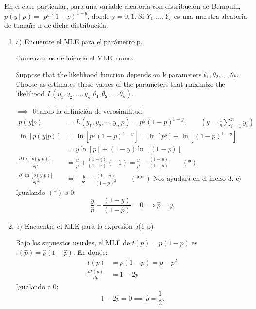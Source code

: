 En el caso particular, para una variable aleatoria con distribución de Bernoulli, $p(y \mid p)=$ $p^{y}(1-p)^{1-y}$, donde $\mathrm{y}=0,1 .$ Si $Y_{1}, \ldots, Y_{n}$ es una muestra aleatoria de tamaño $\mathrm{n}$ de dicha distribución.

\begin{enumerate}
	\item a) Encuentre el MLE para el parámetro p.
	\begin{solution}
		Comenzamos definiendo el MLE, como: 
		\begin{tcolorbox}[colback=gray!15,colframe=black!1!black,title=Method of Maximum Likehood]
			Suppose that the likelihood function depends on k parameters $\theta_1,\theta_2,...,\theta_k$. Choose as estimates those values of the parameters that maximize the likelihood $L(y_1, y_2,..., y_n |\theta_1,\theta_2,...,\theta_k)$.
			\end{tcolorbox}
$\implies$ Usando la definición de verosimilitud: 
\begin{align*}
	p(y|p) &= L(y_1,y_2,\cdots, y_n | p) = p^y(1-p)^{1-y}, \qquad \left(y=\frac{1}{n}\sum_{i=1}^{n}y_i\right)\\
	\ln\left[	p(y|p)\right] &= \ln\left[ p^y(1-p)^{1-y}\right] = \ln\left[p^y\right]+\ln\left[(1-p)^{1-y}\right]\\
	&= y\ln\left[p\right]+(1-y)\ln\left[(1-p)\right]\\
	\frac{\partial\ln\left[	p(y|p)\right]}{\partial p} &= \frac{y}{p}+\frac{(1-y)}{(1-p)}(-1) = \frac{y}{p}-\frac{(1-y)}{(1-p)} \qquad (*)\\
	 \frac{\partial^2\ln\left[	p(y|p)\right]}{\partial p^2} &= -\frac{y}{p^2}-\frac{(1-y)}{(1-p)^2}\qquad \text{$(**)$ Nos ayudará en el inciso 3. c)}
\end{align*}
Igualando $(*)$ a 0: 
$$ \frac{y}{\hat{p}}-\frac{(1-y)}{(1-\hat{p})} =0\implies \hat{p}= y.$$
	\end{solution}
	\item b) Encuentre el MLE para la expresión p(1-p).
	\begin{solution}
		Bajo los supuestos usuales, el MLE de $t(p)=p(1-p)$ es $t(\hat{p})=\hat{p}(1-\hat{p})$. En donde:
		\begin{align*}
			t(p) & = p(1-p) = p-p^2\\
			\frac{dt(p)}{dp} &= 1- 2p
				\end{align*}
Igualando a 0:
$$1-2\hat{p}=0\implies \hat{p}=\frac{1}{2}.$$
		

\end{solution}
\end{enumerate}
